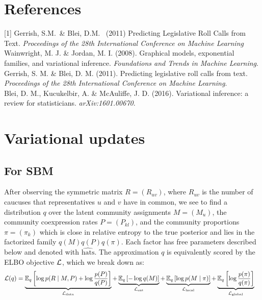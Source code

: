 \documentclass{article}
\begin{document}
\newpage


\section*{References}

\medskip

\small


[1] Gerrish, S.M.\ \& Blei, D.M. \ (2011) Predicting Legislative Roll Calls from Text. {\it Proceedings of the 28th International Conference on Machine Learning}
\noindent[1] Wainwright, M. J. \& Jordan, M. I. (2008). Graphical models, exponential families, and variational inference. {\sl Foundations and Trends in Machine Learning}. \\

\noindent[2] Gerrish, S. M. \& Blei, D. M.  (2011). Predicting legislative roll calls from text. {\it Proceedings of the 28th International Conference on Machine Learning}. \\

\noindent[3] Blei, D. M., Kucukelbir, A. \& McAuliffe, J. D. (2016). Variational inference: a review for statisticians. {\sl arXiv:1601.00670}.


\appendix

\newpage

\section{Variational updates}

\subsection{For SBM}
\label{sbmvi}

After observing the symmetric matrix $R = (R_{uv})$, where $R_{uv}$ is the number of caucuses that representatives $u$ and $v$ have in common, we see to find a distribution $q$ over the latent community assignments $M = (M_u)$, the community coexpression rates $P = (P_{kl})$, and the community proportions $\pi = (\pi_k)$ which is close in relative entropy to the true posterior and lies in the factorized family $q(M)q(P)q(\pi)$. Each factor has free parameters described below and denoted with $\widehat{\text{hats}}$. The approximation $q$ is equivalently scored by the ELBO objective $\mathcal{L}$, which we break down as:%
\begin{equation}
\begin{split}
\mathcal{L}(q)
&= \underbrace{\mathbb{E}_q\left[\log p(R\mid M,P)+ \log\frac{p(P)}{q(P)}\right]}_{\mathcal{L}_{\text{data}}}
+ \underbrace{\mathbb{E}_q\left[-\log q(M)\right]}_{\mathcal{L}_{\text{ent}}}
+ \underbrace{\mathbb{E}_q\left[\log p(M\mid \pi)\right]}_{\mathcal{L}_{\text{local}}}
+ \underbrace{\mathbb{E}_q\left[\log\frac{p(\pi)}{q(\pi)}\right]}_{\mathcal{L}_{\text{global}}}
\end{split}
\end{equation}
\end{document}
